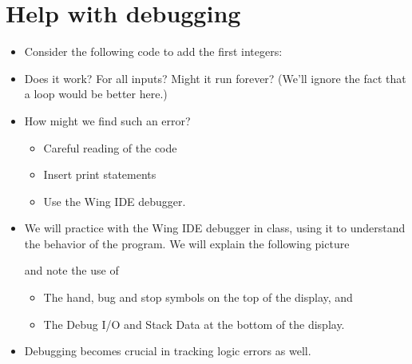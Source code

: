\documentclass[letterpaper,10pt,english]{sphinxmanual}
\begin{document}
\section{Help with debugging}
\label{\detokenize{lecture_notes/lec11_conditionals2:help-with-debugging}}\begin{itemize}
\item {} 
Consider the following code to add the first  integers:

%
\begin{sphinxVerbatim}[commandchars=\\\{\}]
  
  
  
   
      
      
 
\end{sphinxVerbatim}

\item {} 
Does it work?  For all inputs?  Might it run forever?  (We’ll
ignore the fact that a  loop would be better here.)

\item {} 
How might we find such an error?
\begin{itemize}
\item {} 
Careful reading of the code

\item {} 
Insert print statements

\item {} 
Use the Wing IDE debugger.

\end{itemize}

\item {} 
We will practice with the Wing IDE debugger in class, using it to
understand the behavior of the program. We will explain the following
picture

\noindent{}

and note the use of
\begin{itemize}
\item {} 
The hand, bug and stop symbols on the top of the display, and

\item {} 
The Debug I/O and Stack Data at the bottom of the display.

\end{itemize}

\item {} 
Debugging becomes crucial in tracking logic errors as well.

\end{itemize}
\end{document}
